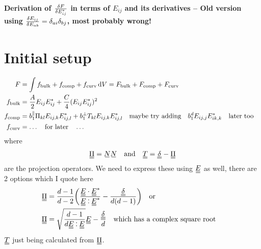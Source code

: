 \documentclass{article}
\newcommand\barbelow[1]{\stackunder[1.2pt]{$#1$}{\rule{1.5ex}{.1ex}}}
\newcommand{\su}[1]{\barbelow{#1}}
\newcommand{\du}[1]{\barbelow{\barbelow{#1}}}
\def\onedot{$\mathsurround0pt\ldotp$}
\def\cddot{\mathbin{
    \vcenter{\baselineskip1ex \vspace{-0.1ex}\hbox{\onedot}\hbox{\onedot}}
}}
\begin{document}
\begin{center}
    \LARGE
    \textbf{Derivation of $\fdv{F}{E_{ij}^*}$ in terms of $E_{ij}$ and its derivatives -- Old version using $\fdv{E_{ij}}{E_{ab}} = \delta_{ai}\delta_{bj}$, most probably wrong!}
\end{center}
\vspace{1em}
\section{Initial setup}
\begin{align}
    F & = \int f_\text{bulk} + f_\text{comp} + f_\text{curv} \dd{V} = F_\text{bulk} + F_\text{comp} + F_\text{curv}\\
    f_\text{bulk} & = \frac{A}{2} E_{ij}E_{ij}^* + \frac{C}{4} (E_{ij}E_{ij}^*)^2 \\
    f_\text{comp} & = b_1^\parallel \Pi_{kl} E_{ij,k}E_{ij,l}^* + b_1^\perp T_{kl} E_{ij,k}E_{ij,l}^* \qq{maybe try adding} b_1^d E_{ij,j}E_{ik,k}^* \qq{later too} \\
    f_\text{curv} & = \ldots \qq{for later} \ldots \\
\end{align}
where
\begin{align}
    \du{\Pi} = \su{N} \su{N} && \text{and} && \du{T} = \du{\delta} - \du{\Pi}
\end{align}
are the projection operators. We need to express these using $\du{E}$ as well, there are 2 options which I quote here
\begin{align}
    \du{\Pi} & = \frac{d-1}{d-2}\qty(\frac{\du{E} \cdot \du{E}^*}{\du{E} \cddot \du{E}^*} - \frac{\du{\delta}}{d(d-1)}) \qq{or} \label{eq:piex1}\\
    \du{\Pi} & = \sqrt{\frac{d-1}{d \du{E} \cddot \du{E}}} \du{E} - \frac{\du{\delta}}{d} \label{eq:piex2} \qq{which has a complex square root}
\end{align}
$\du{T}$ just being calculated from $\du{\Pi}$.
\end{document}
